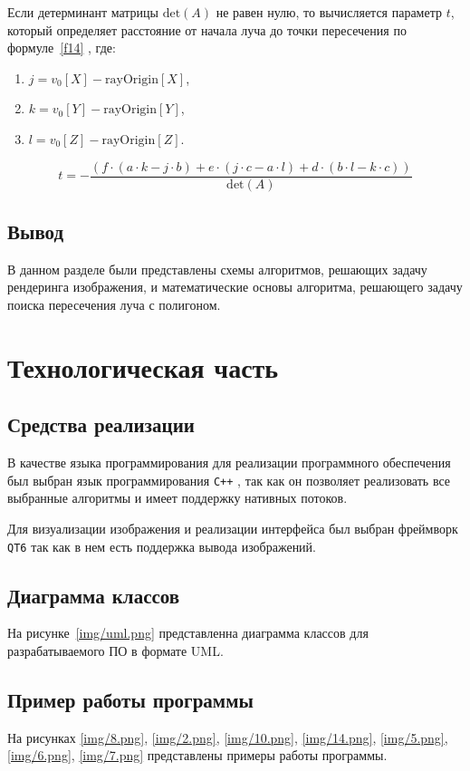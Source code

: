 Если детерминант матрицы \(\text{det}(A)\) не равен нулю, то вычисляется параметр \(t\), который определяет расстояние от начала луча до точки пересечения по формуле~\ref{f14} \cite{sherley}, где:
\begin{enumerate}
    \item \(j = v_0[X] - \text{rayOrigin}[X]\),
    \item \(k = v_0[Y] - \text{rayOrigin}[Y]\),
    \item \(l = v_0[Z] - \text{rayOrigin}[Z]\).
\end{enumerate}

\begin{equation}
t = - \frac{(f \cdot (a \cdot k - j \cdot b) + e \cdot (j \cdot c - a \cdot l) + d \cdot (b \cdot l - k \cdot c))}{\text{det}(A)}
\label{f14}
\end{equation}

\section{Вывод}
В данном разделе были представлены схемы алгоритмов, решающих задачу рендеринга изображения, и математические основы алгоритма, решающего задачу поиска пересечения луча с полигоном.

\chapter{Технологическая часть}
\section{Средства реализации}
В качестве языка программирования для реализации программного
обеспечения был выбран язык программирования \texttt{C++} \cite{cpp}, так как он позволяет реализовать все выбранные алгоритмы и имеет поддержку нативных потоков.

Для визуализации изображения и реализации интерфейса был выбран фреймворк \texttt{QT6} \cite{qt6} так как в нем есть поддержка вывода изображений.

\section{Диаграмма классов}
На рисунке~\ref{img/uml.png} представленна диаграмма классов для разрабатываемого ПО в формате UML.

\section{Пример работы программы}
На рисунках \ref{img/8.png}, \ref{img/2.png}, \ref{img/10.png}, \ref{img/14.png}, \ref{img/5.png}, \ref{img/6.png}, \ref{img/7.png} представлены примеры работы программы.

